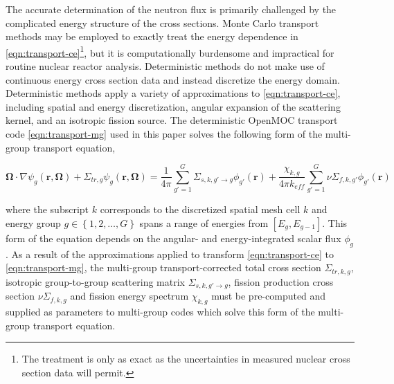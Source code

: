 The accurate determination of the neutron flux is primarily challenged by the complicated energy structure of the cross sections. Monte Carlo transport methods may be employed to exactly treat the energy dependence in \cref{eqn:transport-ce}\footnote{The treatment is only as exact as the uncertainties in measured nuclear cross section data will permit.}, but it is computationally burdensome and impractical for routine nuclear reactor analysis. Deterministic methods do not make use of continuous energy cross section data and instead discretize the energy domain. Deterministic methods apply a variety of approximations to \cref{eqn:transport-ce}, including spatial and energy discretization, angular expansion of the scattering kernel, and an isotropic fission source. The deterministic OpenMOC transport code \cref{eqn:transport-mg} used in this paper solves the following form of the multi-group transport equation,

\begin{equation}
\label{eqn:transport-mg}
\mathbf{\Omega} \cdot \nabla \psi_{g}(\mathbf{r},\mathbf{\Omega}) + \Sigma_{tr,g}\psi_{g}(\mathbf{r},\mathbf{\Omega}) = \frac{1}{4\pi} \sum_{g'=1}^{G} \Sigma_{s,k,g' \rightarrow g}\phi_{g'}(\mathbf{r}) + \frac{\chi_{k,g}}{4\pi k_{eff}}\sum_{g'=1}^{G} \nu\Sigma_{f,k,g'}\phi_{g'}(\mathbf{r})
\end{equation}

\noindent where the subscript $k$ corresponds to the discretized spatial mesh cell $k$ and energy group $g \in \left\{1, 2, \ldots, G\right\}$ spans a range of energies from $\left[E_{g}, E_{g-1}\right]$. This form of the equation depends on the angular- and energy-integrated scalar flux $\phi_g$. As a result of the approximations applied to transform \cref{eqn:transport-ce} to \cref{eqn:transport-mg}, the multi-group transport-corrected total cross section $\Sigma_{tr,k,g}$, isotropic group-to-group scattering matrix $\Sigma_{s,k,g'\rightarrow g}$, fission production cross section $\nu\Sigma_{f,k,g}$ and fission energy spectrum $\chi_{k,g}$ must be pre-computed and supplied as parameters to multi-group codes which solve this form of the multi-group transport equation.
